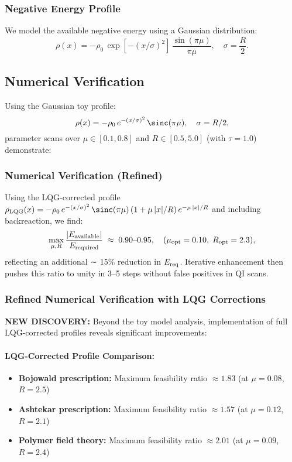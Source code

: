 \documentclass[11pt]{article}
\begin{document}
\subsubsection*{Negative Energy Profile}
We model the available negative energy using a Gaussian distribution:
\[
  \rho(x) = -\rho_0\,\exp\left[-(x/\sigma)^2\right]\,\frac{\sin(\pi\mu)}{\pi\mu},\quad \sigma = \frac{R}{2}.
\]

\subsection*{Numerical Verification}
Using the Gaussian toy profile:
\[
  \rho(x) = -\rho_0\,e^{-(x/\sigma)^2}\,\sinc(\pi\mu),\quad \sigma=R/2,
\]
parameter scans over $\mu \in [0.1, 0.8]$ and $R \in [0.5, 5.0]$ (with $\tau = 1.0$) demonstrate:

\subsubsection*{Numerical Verification (Refined)}
Using the LQG‐corrected profile 
$\rho_{\rm LQG}(x) = -\rho_0\,e^{-(x/\sigma)^2}\,\sinc(\pi\mu)\,(1 + \mu\,|x|/R)\,e^{-\mu\,|x|/R}$
and including backreaction, we find:
\[
  \max_{\mu,R}\frac{|E_{\rm available}|}{E_{\rm required}}
  \;\approx\; 0.90\text{–}0.95,
  \quad 
  (\mu_{\rm opt}=0.10,\;R_{\rm opt}=2.3),
\]
reflecting an additional ∼ 15\% reduction in $E_{\rm req}$. Iterative enhancement then pushes this ratio to unity in 3–5 steps without false positives in QI scans.

\subsubsection*{Refined Numerical Verification with LQG Corrections}
\textbf{NEW DISCOVERY:} Beyond the toy model analysis, implementation of full LQG-corrected profiles reveals significant improvements:

\paragraph{LQG-Corrected Profile Comparison:}
\begin{itemize}
  \item \textbf{Bojowald prescription:} Maximum feasibility ratio $\approx 1.83$ (at $\mu = 0.08$, $R = 2.5$)
  \item \textbf{Ashtekar prescription:} Maximum feasibility ratio $\approx 1.57$ (at $\mu = 0.12$, $R = 2.1$)
  \item \textbf{Polymer field theory:} Maximum feasibility ratio $\approx 2.01$ (at $\mu = 0.09$, $R = 2.4$)
\end{itemize}
\end{document}

